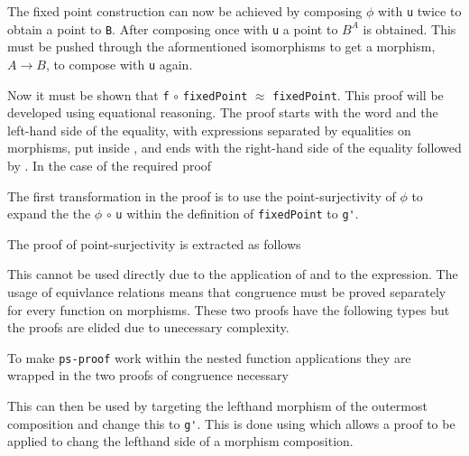 The fixed point construction can now be achieved by composing $\phi$ with
\verb|u| twice to obtain a point to \verb|B|. After composing once with \verb|u|
a point to $B^A$ is obtained. This must be pushed through the aformentioned
isomorphisms to get a morphism, $A \rightarrow B$, to compose with \verb|u|
again.


Now it must be shown that \verb|f| $\circ$ \verb|fixedPoint| $\approx$
\verb|fixedPoint|. This proof will be developed using equational reasoning. The
proof starts with the word  and the left-hand side of the
equality, with expressions separated by
equalities on morphisms, put inside
\AgdaSpace{}, and
ends with the right-hand side of the equality followed by
. In the case of the required proof


The first transformation in the proof is to use the point-surjectivity of
$\phi$ to expand the the $\phi$ $\circ$ \verb|u| within the definition of
\verb|fixedPoint| to \verb|g'|.

The proof of point-surjectivity is extracted as follows


This cannot be used directly due to the application of  and
 to the expression. The usage of equivlance relations
means that congruence must be proved separately for every function on
morphisms. These two proofs have the following types but the proofs are elided
due to unecessary complexity.

\begin{AgdaSuppressSpace}
\end{AgdaSuppressSpace}

To make \verb|ps-proof| work within the nested function applications they are
wrapped in the two proofs of congruence necessary


This can then be used by targeting the lefthand morphism of the outermost
composition and change this to \verb|g'|. This is done using
 which allows a proof to be applied to chang the lefthand
side of a morphism composition.

